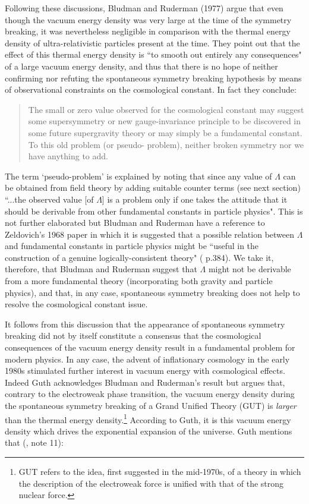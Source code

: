 \documentclass[12pt]{article}
\begin{document}
Following these discussions, Bludman and Ruderman (1977)
\cite{bludman77} argue that even though the vacuum energy density was
very large at the time of the symmetry breaking, it was nevertheless
negligible in comparison with the thermal energy density of
ultra-relativistic particles present at the time. They point out that
the effect of this thermal energy density is ``to smooth out entirely
any consequences" of a large vacuum energy density, and thus that
there is no hope of neither confirming nor refuting the spontaneous
symmetry breaking hypothesis by means of observational constraints on
the cosmological constant. In fact they conclude:
\begin{quote}
The small or zero value observed for the cosmological constant
may suggest some supersymmetry or new gauge-invariance principle
to be discovered in some future supergravity theory or may simply
be a fundamental constant. To this old problem (or pseudo-
problem), neither broken symmetry nor we have anything to add.
\cite{bludman77}
\end{quote}
The term `pseudo-problem' is explained by noting that since any
value of $\Lambda$ can be obtained from field theory by adding
suitable counter terms (see next section) ``...the observed value
[of $\Lambda$] is a problem only if one takes the attitude that it
should be derivable from other fundamental constants in particle
physics". This is not further elaborated but Bludman and Ruderman
have a reference to Zeldovich's 1968 paper in which it is
suggested that a possible relation between $\Lambda$ and
fundamental constants in particle physics might be ``useful in the
construction of a genuine logically-consistent theory"
(\cite{zeldovich68} p.384). We take it, therefore, that Bludman
and Ruderman suggest that $\Lambda$ might not be derivable from a
more fundamental theory (incorporating both gravity and particle
physics), and that, in any case, spontaneous symmetry breaking
does not help to resolve the cosmological constant issue.

It follows from this discussion that the appearance of spontaneous
symmetry breaking did not by itself constitute a consensus that
the cosmological consequences of the vacuum energy density result
in a fundamental problem for modern physics. In any case, the
advent of inflationary cosmology in the early 1980s stimulated
further interest in vacuum energy with cosmological effects.
Indeed Guth \cite{guth81} acknowledges Bludman and Ruderman's
result but argues that, contrary to the electroweak phase
transition, the vacuum energy density during the spontaneous
symmetry breaking of a Grand Unified Theory (GUT) is {\em
larger} than the thermal energy density.\footnote{GUT refers to
the idea, first suggested in the mid-1970s, of a theory in
which the description of the electroweak force is unified with
that of the strong nuclear force.} According to Guth, it is this
vacuum energy density which drives the exponential expansion of
the universe. Guth mentions that (\cite{guth81}, note 11):
\end{document}
